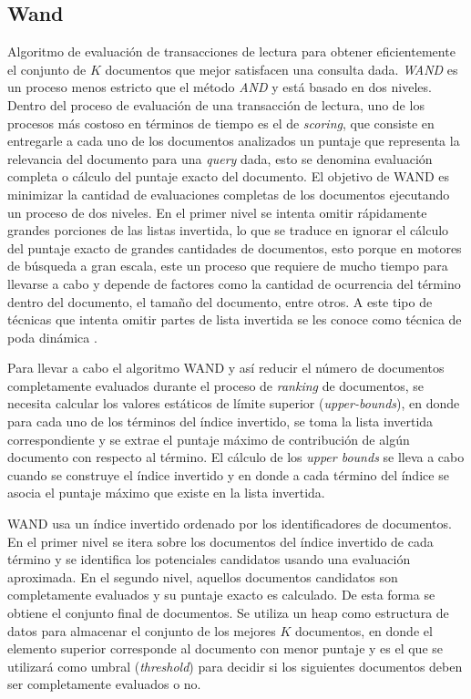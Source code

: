 \subsection{Wand}
\label{marco:wand}
Algoritmo de evaluación de transacciones de lectura para obtener eficientemente el conjunto de $K$ documentos que mejor satisfacen una consulta dada. \textit{WAND} \citep{Broder:2003} es un proceso menos estricto que el método \textit{AND} y está basado en dos niveles. Dentro del proceso de evaluación de una transacción de lectura, uno de los procesos más costoso en términos de tiempo es el de \textit{scoring}, que consiste en entregarle a cada uno de los documentos analizados un puntaje que representa la relevancia del documento para una \textit{query} dada, esto se denomina evaluación completa o cálculo del puntaje exacto del documento. El objetivo de WAND es minimizar la cantidad de evaluaciones completas de los documentos ejecutando un proceso de dos niveles. En el primer nivel se intenta omitir rápidamente grandes porciones de las listas invertida, lo que se traduce en ignorar el cálculo del puntaje exacto de grandes cantidades de documentos, esto porque en motores de búsqueda a gran escala, este un proceso que requiere de mucho tiempo para llevarse a cabo y depende de factores como la cantidad de ocurrencia del término dentro del documento, el tamaño del documento, entre otros. A este tipo de técnicas que intenta omitir partes de lista invertida se les conoce como técnica de poda dinámica \citep{Broder:2003, Persin:1994, Turtle:1995}. 

Para llevar a cabo el algoritmo WAND y así reducir el número de documentos completamente evaluados durante el proceso de \textit{ranking} de documentos, se necesita calcular los valores estáticos de límite superior (\textit{upper-bounds}), en donde para cada uno de los términos del índice invertido, se toma la lista invertida correspondiente y se extrae el puntaje máximo de contribución de algún documento con respecto al término. El cálculo de los \textit{upper bounds} se lleva a cabo cuando se construye el índice invertido y en donde a cada término del índice se asocia el puntaje máximo que existe en la lista invertida. 

WAND usa un índice invertido ordenado por los identificadores de documentos. En el primer nivel se itera sobre los documentos del índice invertido de cada término y se identifica los potenciales candidatos usando una evaluación aproximada. En el segundo nivel, aquellos documentos candidatos son completamente evaluados y su puntaje exacto es calculado. De esta forma se obtiene el conjunto final de documentos. Se utiliza un heap como estructura de datos para almacenar el conjunto de los mejores $K$ documentos, en donde el elemento superior corresponde al documento con menor puntaje y es el que se utilizará como umbral (\textit{threshold}) para decidir si los siguientes documentos deben ser completamente evaluados o no. 


